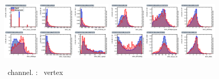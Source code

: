 \begin{figure}[htbp]
	\includegraphics[width=0.48\textwidth]{6_Search/Figures/MVAtechnics/toppairzct/uuu/variables_id_c1.png}
	\includegraphics[width=0.48\textwidth]{6_Search/Figures/MVAtechnics/toppairzct/uuu/variables_id_c2.png}
	\caption{\mumumu\ channel. \TTSR: \Zct\ vertex }
	\label{image:Figuresuuutoppairzct}
\end{figure}


